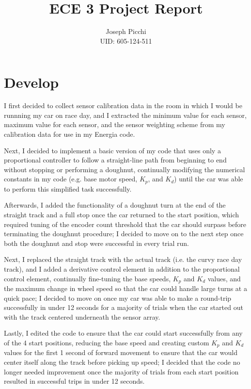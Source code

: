 \documentclass{article}
\title{ECE 3 Project Report}
\author{Joseph Picchi\\
UID: 605-124-511}
\date{}
\begin{document}
\maketitle

\section{Develop}
\label{section:Develop}

I first decided to collect sensor calibration data in the room in which I would be runnning my car on race day, and I extracted the minimum value for each sensor, maximum value for each sensor, and the sensor weighting scheme from my calibration data for use in my Energia code.

Next, I decided to implement a basic version of my code that uses only a proportional controller to follow a straight-line path from beginning to end without stopping or performing a doughnut, continually modifying the numerical constants in my code (e.g. base motor speed, \(K_p\), and \(K_d\)) until the car was able to perform this simplified task successfully.

Afterwards, I added the functionality of a doughnut turn at the end of the straight track and a full stop once the car returned to the start position, which required tuning of the encoder count threshold that the car should surpass before terminating the doughnut procedure; I decided to move on to the next step once both the doughnut and stop were successful in every trial run.

Next, I replaced the straight track with the actual track (i.e. the curvy race day track), and I added a derivative control element in addition to the proportional control element, continually fine-tuning the base speeds, \(K_p\) and \(K_d\) values, and the maximum change in wheel speed so that the car could handle large turns at a quick pace; I decided to move on once my car was able to make a round-trip successfully in under 12 seconds for a majority of trials when the car started out with the track centered underneath the sensor array.

Lastly, I edited the code to ensure that the car could start successfully from any of the 4 start positions, reducing the base speed and creating custom \(K_p\) and \(K_d\) values for the first 1 second of forward movement to ensure that the car would center itself along the track before picking up speed; I decided that the code no longer needed improvement once the majority of trials from each start position resulted in successful trips in under 12 seconds.
\end{document}
